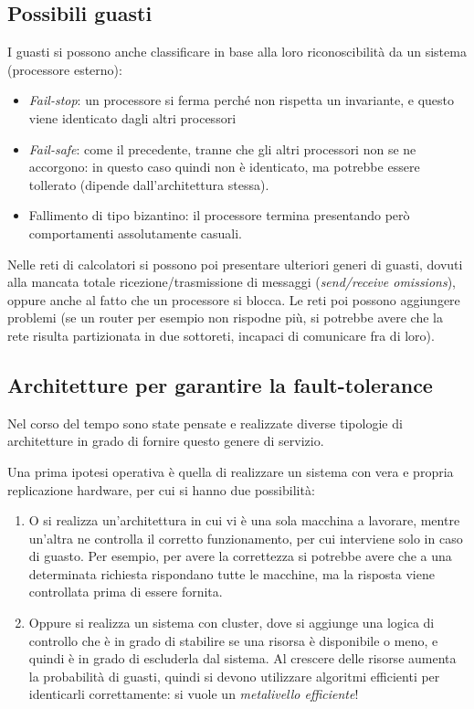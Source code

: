 \subsection{Possibili guasti}
I guasti si possono anche classificare in base alla loro riconoscibilità da un sistema (processore esterno):
\begin{itemize}
 \item \textit{Fail-stop}: un processore si ferma perché non rispetta un invariante, e questo viene identicato dagli
 altri processori
 \item \textit{Fail-safe}: come il precedente, tranne che gli altri processori non se ne accorgono: in questo caso
 quindi non è identicato, ma potrebbe essere tollerato (dipende dall'architettura stessa).
 \item Fallimento di tipo bizantino: il processore termina presentando però comportamenti assolutamente casuali.
\end{itemize}
Nelle reti di calcolatori si possono poi presentare ulteriori generi di guasti, dovuti alla mancata totale
ricezione/trasmissione di messaggi (\textit{send/receive omissions}), oppure anche al fatto che un processore si 
blocca. Le reti poi possono aggiungere problemi (se un router per esempio non rispodne più, si potrebbe avere che la
rete risulta partizionata in due sottoreti, incapaci di comunicare fra di loro).
\subsection{Architetture per garantire la fault-tolerance}
Nel corso del tempo sono state pensate e realizzate diverse tipologie di architetture in grado di fornire questo genere
di servizio.

Una prima ipotesi operativa è quella di realizzare un sistema con vera e propria replicazione hardware, per cui si 
hanno due possibilità:
\begin{enumerate}
 \item O si realizza un'architettura in cui vi è una sola macchina a lavorare, mentre un'altra ne controlla il corretto
 funzionamento, per cui interviene solo in caso di guasto. Per esempio, per avere la correttezza si potrebbe
 avere che a una determinata richiesta rispondano tutte le macchine, ma la risposta viene controllata prima di essere
 fornita.
 \item Oppure si realizza un sistema con cluster, dove si aggiunge una logica di controllo che è in grado di stabilire
  se una risorsa è disponibile o meno, e quindi è in grado di escluderla dal sistema. Al crescere delle risorse
  aumenta la probabilità di guasti, quindi si devono utilizzare algoritmi efficienti per identicarli correttamente: si
  vuole un \textit{metalivello efficiente}!
\end{enumerate}

